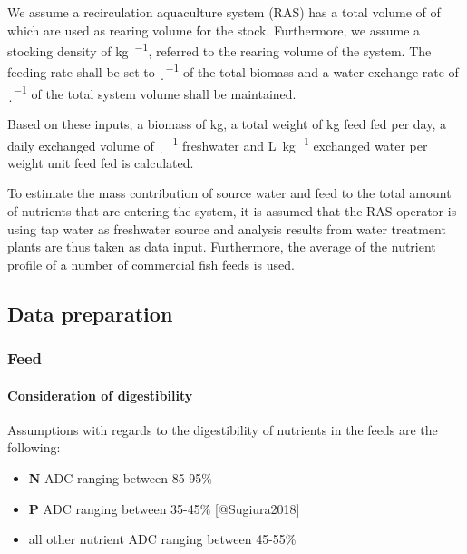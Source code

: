 \documentclass[
]{article}
\providecommand{\tightlist}{%
  \setlength{\itemsep}{0pt}\setlength{\parskip}{0pt}}
\begin{document}
We assume a recirculation aquaculture system (RAS) has a total volume of
\si{\cubicm} of which \si{\cubicm} are used as rearing volume for the
stock. Furthermore, we assume a stocking density of \si{\kg\per\cubicm},
referred to the rearing volume of the system. The feeding rate shall be
set to \si{\p\per\d} of the total biomass and a water exchange rate of
\si{\p\per\d} of the total system volume shall be maintained.

Based on these inputs, a biomass of \si{\kg}, a total weight of \si{\kg}
feed fed per day, a daily exchanged volume of \si{\cubicm\per\d}
freshwater and \si{\L\per\kg} exchanged water per weight unit feed fed
is calculated.

To estimate the mass contribution of source water and feed to the total
amount of nutrients that are entering the system, it is assumed that the
RAS operator is using tap water as freshwater source and analysis
results from water treatment plants are thus taken as data input.
Furthermore, the average of the nutrient profile of a number of
commercial fish feeds is used.

\hypertarget{data-preparation}{%
\subsection{Data preparation}\label{data-preparation}}

\hypertarget{feed-2}{%
\subsubsection{Feed}\label{feed-2}}

\hypertarget{consideration-of-digestibility}{%
\paragraph{Consideration of
digestibility}\label{consideration-of-digestibility}}

Assumptions with regards to the digestibility of nutrients in the feeds
are the following:

\begin{itemize}
\tightlist
\item
  \textbf{N} ADC ranging between 85-95\%
\item
  \textbf{P} ADC ranging between 35-45\% {[}@Sugiura2018{]}
\item
  all other nutrient ADC ranging between 45-55\%
\end{itemize}
\end{document}

